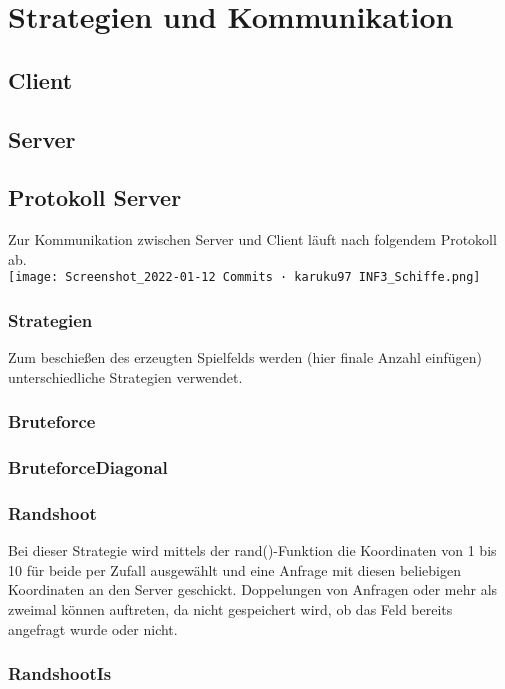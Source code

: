 \section*{Strategien und Kommunikation}

\subsection*{Client}




\subsection*{Server}

\subsection*{Protokoll Server}
Zur Kommunikation zwischen Server und Client läuft nach folgendem Protokoll ab.\\
\texttt{[image: Screenshot\_2022-01-12 Commits · karuku97 INF3\_Schiffe.png]}
\\
\subsubsection*{Strategien}
Zum beschießen des erzeugten Spielfelds werden (hier finale Anzahl einfügen) unterschiedliche Strategien verwendet.

\subsubsection*{Bruteforce}

\subsubsection*{BruteforceDiagonal}

\subsubsection*{Randshoot}

Bei dieser Strategie wird mittels der rand()-Funktion die Koordinaten von 1 bis 10 für
beide per Zufall ausgewählt und eine Anfrage mit diesen beliebigen Koordinaten an den
Server geschickt. Doppelungen von Anfragen oder mehr als zweimal können auftreten,
da nicht gespeichert wird, ob das Feld bereits angefragt wurde oder nicht.

\subsubsection*{RandshootIs}

